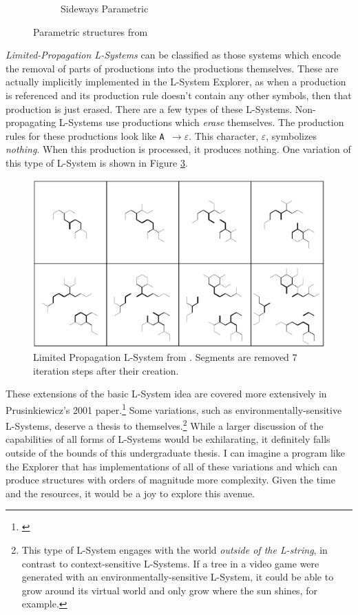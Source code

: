 \documentclass[12pt,twoside]{reedthesis}
\newcommand{\code}[1]{\texttt{#1}}
\begin{document}
\begin{figure}[h]
\begin{subfigure}{0.5\linewidth}
		\caption{Sideways Parametric}
		\label{SidewaysParametric}
	\end{subfigure}
	\caption{Parametric structures from \cite{LSystems2001}}
	\label{Parametric}
	\end{figure}
	
	\textit{Limited-Propagation L-Systems} can be classified as those systems which encode the removal of parts of productions into the productions themselves. These are actually implicitly implemented in the L-System Explorer, as when a production is referenced and its production rule doesn't contain any other symbols, then that production is just erased. There are a few types of these L-Systems. Non-propagating L-Systems use productions which \textit{erase} themselves. The production rules for these productions look like \code{A $\rightarrow \varepsilon$}. This character, $\varepsilon$, symbolizes \textit{nothing}. When this production is processed, it produces nothing. One variation of this type of L-System is shown in Figure \ref{LimitedPropagation}.
	
	
	\begin{figure}[h]
	\centering
	\includegraphics[width=0.8\linewidth]{Images/LimitedPropagation}
	\caption[Limited Propagation L-System from \cite{LSystems2001}]{Limited Propagation L-System from \cite{LSystems2001}. Segments are removed 7 iteration steps after their creation.}
	\label{LimitedPropagation}
	\end{figure}
	
	These extensions of the basic L-System idea are covered more extensively in Prusinkiewicz's 2001 paper.\footnote{\cite{LSystems2001}} Some variations, such as environmentally-sensitive L-Systems, deserve a thesis to themselves.\footnote{This type of L-System engages with the world \textit{outside of the L-string}, in contrast to context-sensitive L-Systems. If a tree in a video game were generated with an environmentally-sensitive L-System, it could be able to grow around its virtual world and only grow where the sun shines, for example.} While a larger discussion of the capabilities of all forms of L-Systems would be exhilarating, it definitely falls outside of the bounds of this undergraduate thesis. I can imagine a program like the Explorer that has implementations of all of these variations and which can produce structures with orders of magnitude more complexity. Given the time and the resources, it would be a joy to explore this avenue.
	
\end{document}
